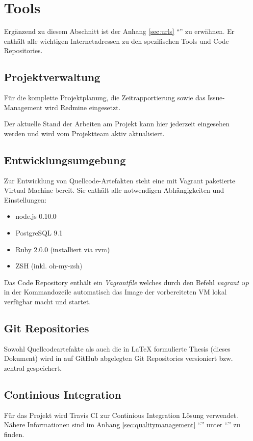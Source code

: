 \section{Tools}
\label{sec:tools}

Ergänzend zu diesem Abschnitt ist der Anhang \ref{sec:urls} ``'' zu erwähnen. Er enthält alle wichtigen Internetadressen zu den spezifischen Tools und Code Repositories.

\subsection{Projektverwaltung}
Für die komplette Projektplanung, die Zeitrapportierung sowie das Issue-Management wird Redmine eingesetzt.

Der aktuelle Stand der Arbeiten am Projekt kann hier jederzeit eingesehen werden und wird vom Projektteam aktiv aktualisiert.


\subsection{Entwicklungsumgebung}
Zur Entwicklung von Quellcode-Artefakten steht eine mit Vagrant \cite{Vagrant} paketierte Virtual Machine bereit. Sie enthält alle notwendigen Abhängigkeiten und Einstellungen:


\begin{itemize}
	\item node.js 0.10.0
	\item PostgreSQL 9.1
	\item Ruby 2.0.0 (installiert via rvm)
	\item ZSH (inkl. oh-my-zsh)
\end{itemize}

Das Code Repository enthält ein \emph{Vagrantfile} welches durch den Befehl \emph{vagrant up} in der Kommandozeile automatisch das Image der vorbereiteten VM lokal verfügbar macht und startet.

\subsection{Git Repositories}
Sowohl Quellcodeartefakte als auch die in LaTeX formulierte Thesis (dieses Dokument) wird in auf GitHub abgelegten Git Repositories versioniert bzw. zentral gespeichert.

\subsection{Continious Integration}
Für das Projekt wird Travis CI zur Continious Integration Lösung verwendet. Nähere Informationen sind im Anhang \ref{sec:qualitymanagement} ``'' unter ``'' zu finden.